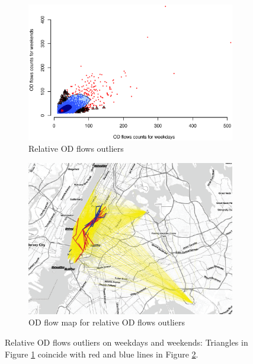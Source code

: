 \documentclass[a4paper,UKenglish]{lipics-v2018}
\begin{document}
\begin{figure}
	\centering
	\begin{subfigure}[b]{0.49\textwidth}
		\includegraphics[width=\textwidth]{images/Outliers_rare_weekdays_weekends.eps}
		\caption{Relative OD flows outliers}
		\label{fig:weekdays_rare}
	\end{subfigure}
	\hfill %
	\begin{subfigure}[b]{0.49\textwidth}
		\includegraphics[width=\textwidth]{images/outliers_rare2_weekdays_weekends.eps}
		\caption{OD flow map for relative OD flows outliers}
		\label{fig:weekdays_rare_map}
	\end{subfigure}
	\caption{Relative OD flows outliers on weekdays and weekends: Triangles in Figure \ref{fig:weekdays_rare} coincide with red and blue lines in Figure \ref{fig:weekdays_rare_map}. }\label{fig:weekdays_rare_OD_map}	
\end{figure}
\end{document}
